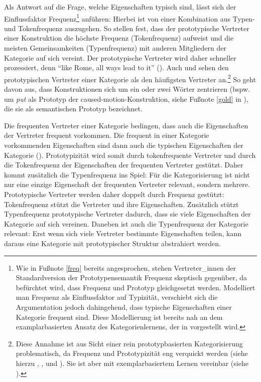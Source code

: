 Als Antwort auf die Frage, welche Eigenschaften typisch sind, lässt sich der Einflussfaktor Frequenz\footnote{Wie in Fußnote \ref{freq} bereits angesprochen, stehen Vertreter\_innen der Standardversion der Prototypensemantik Frequenz skeptisch gegenüber, da befürchtet wird, dass Frequenz und Prototyp gleichgesetzt werden. Modelliert man Frequenz als Einflussfaktor auf Typizität, verschiebt sich die Argumentation jedoch dahingehend, dass typische Eigenschaften einer Kategorie frequent sind. Diese Modellierung ist bereits nah an dem examplarbasierten Ansatz des Kategorienlernens, der in  vorgestellt wird.} anführen: Hierbei ist von einer Kombination aus Ty\-pen- und Tokenfrequenz auszugehen. So stellen \textcite[85]{Ellis.2014} fest, dass der prototypische Vertreter einer Konstruktion die höchste Frequenz (Tokenfrequenz) aufweist und die meisten Gemeinsamkeiten (Typenfrequenz) mit anderen Mitgliedern der Kategorie auf sich vereint. Der prototypische Vertreter wird daher schneller prozessiert, denn "`like Rome, all ways lead to it"' (\cite[85]{Ellis.2014}). Auch \textcite[88]{Goldberg.2006} und \textcite[79--80]{Bybee.2010} sehen den prototypischen Vertreter einer Kategorie als den häufigsten Vertreter an.\footnote{Diese Annahme ist aus Sicht einer rein prototypbasierten Kategorisierung problematisch, da Frequenz und Prototypizität eng verquickt werden (siehe hierzu \cite[42]{Kleiber.1993}, \cite[52]{Taylor.1995}, \cite[50]{Schmid.2000} und \cite[567--568]{Taylor.2015}). Sie ist aber mit exemplarbasiertem Lernen vereinbar (siehe ).} So geht \textcite[88]{Goldberg.2006} davon aus, dass Konstruktionen sich um ein oder zwei Wörter zentrieren (bspw. um \textit{put} als Prototyp der caused-motion-Konstruktion, siehe Fußnote \ref{gold} in ), die sie als semantischen Prototyp bezeichnet.

Die frequenten Vertreter einer Kategorie bedingen, dass auch die Eigenschaften der Vertreter frequent vorkommen. Die frequent in einer Kategorie vorkommenden Eigenschaften sind dann auch die typischen Eigenschaften der Kategorie (\cite[52]{Kleiber.1993}). Prototypizität wird somit durch tokenfrequente Vertreter und durch die Tokenfrequenz der Eigenschaften der frequenten Vertreter gestützt. Daher kommt zusätzlich die Typenfrequenz ins Spiel: Für die Kategorisierung ist nicht nur eine einzige Eigenschaft der frequenten Vertreter relevant, sondern mehrere. Prototypische Vertreter werden daher doppelt durch Frequenz gestützt: Tokenfrequenz stützt die Vertreter und ihre Eigenschaften. Zusätzlich stützt Typenfrequenz prototypische Vertreter dadurch, dass sie viele Eigenschaften der Kategorie auf sich vereinen. Daneben ist auch die Typenfrequenz der Kategorie relevant: Erst wenn sich viele Vertreter bestimmte Eigenschaften teilen, kann daraus eine Kategorie mit prototypischer Struktur abstrahiert werden.\largerpage

